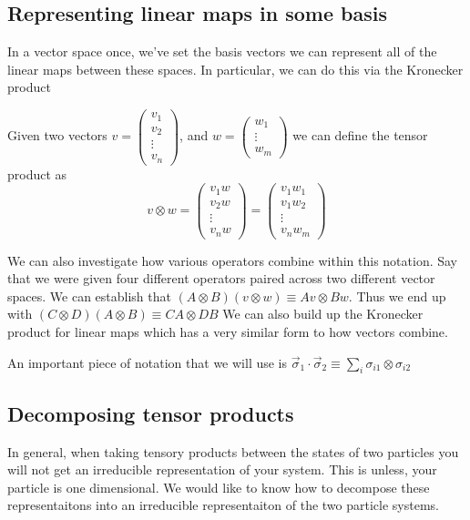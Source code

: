 \subsection{Representing linear maps in some basis}
In a vector space once, we've set the basis vectors we can represent
all of the linear maps between these spaces. In particular, we can do
this via the Kronecker product
\begin{definition}
\label{kronProd}
Given two vectors $v = \begin{pmatrix} v_1 \\ v_2 \\ \vdots \\ v_n \end{pmatrix}$, and
$w = \begin{pmatrix} w_1 \\ \vdots \\ w_m \end{pmatrix}$ we can define the tensor
product as
$$
    v \otimes w = \begin{pmatrix}
        v_1 w \\
        v_2 w \\
        \vdots \\
        v_n w
    \end{pmatrix} =
    \begin{pmatrix}
        v_1 w_1 \\
        v_1 w_2 \\
        \vdots \\
        v_n w_m
    \end{pmatrix}
$$
\end{definition}
We can also investigate how various operators combine within this notation. Say
that we were given four different operators paired across two different
vector spaces. We can establish that
$\left(A \otimes B\right) \left(v \otimes w\right) \equiv A v \otimes B w$.
Thus we end up with
$\left(C \otimes D\right) \left(A \otimes B\right) \equiv
CA \otimes DB$
We can also build up the Kronecker product for linear maps which has
a very similar form to how vectors combine.

An important piece of notation that we will use is
$\vec{\sigma}_1 \cdot \vec{\sigma}_2 \equiv
\sum_{i} \sigma_{i1} \otimes \sigma_{i2}$

\subsection{Decomposing tensor products}
In general, when taking tensory products between the states of two particles
you will not get an irreducible representation of your system. This is unless,
your particle is one dimensional. We would like to know how to decompose these
representaitons into an irreducible representaiton of the two particle systems.

